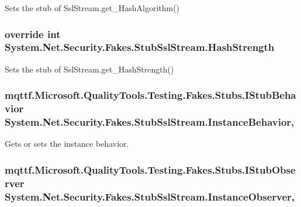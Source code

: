 Sets the stub of Ssl\-Stream.\-get\-\_\-\-Hash\-Algorithm()

\hypertarget{class_system_1_1_net_1_1_security_1_1_fakes_1_1_stub_ssl_stream_a669a7a9d4816bb75a468da83e294d84c}{
\subsubsection[{Hash\-Strength}]{\setlength{\rightskip}{0pt plus 5cm}override int System.\-Net.\-Security.\-Fakes.\-Stub\-Ssl\-Stream.\-Hash\-Strength\hspace{0.3cm}{\ttfamily [get]}}}\label{class_system_1_1_net_1_1_security_1_1_fakes_1_1_stub_ssl_stream_a669a7a9d4816bb75a468da83e294d84c}


Sets the stub of Ssl\-Stream.\-get\-\_\-\-Hash\-Strength()

\hypertarget{class_system_1_1_net_1_1_security_1_1_fakes_1_1_stub_ssl_stream_a38ff36e7f6c5ebb3e3d73a6a0d2da070}{
\subsubsection[{Instance\-Behavior}]{\setlength{\rightskip}{0pt plus 5cm}mqttf.\-Microsoft.\-Quality\-Tools.\-Testing.\-Fakes.\-Stubs.\-I\-Stub\-Behavior System.\-Net.\-Security.\-Fakes.\-Stub\-Ssl\-Stream.\-Instance\-Behavior\hspace{0.3cm}{\ttfamily [get]}, {\ttfamily [set]}}}\label{class_system_1_1_net_1_1_security_1_1_fakes_1_1_stub_ssl_stream_a38ff36e7f6c5ebb3e3d73a6a0d2da070}


Gets or sets the instance behavior.

\hypertarget{class_system_1_1_net_1_1_security_1_1_fakes_1_1_stub_ssl_stream_ac8612e9408aa568e391f7c40c793b7e4}{
\subsubsection[{Instance\-Observer}]{\setlength{\rightskip}{0pt plus 5cm}mqttf.\-Microsoft.\-Quality\-Tools.\-Testing.\-Fakes.\-Stubs.\-I\-Stub\-Observer System.\-Net.\-Security.\-Fakes.\-Stub\-Ssl\-Stream.\-Instance\-Observer\hspace{0.3cm}{\ttfamily [get]}, {\ttfamily [set]}}}\label{class_system_1_1_net_1_1_security_1_1_fakes_1_1_stub_ssl_stream_ac8612e9408aa568e391f7c40c793b7e4}


